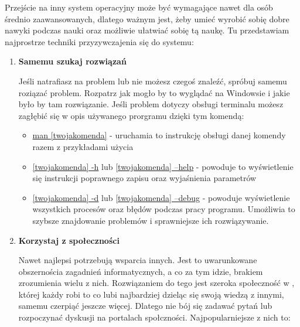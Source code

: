 \documentclass[10pt,a4paper]{report}
\begin{document}
Przejście na inny system operacyjny może być wymagające nawet dla osób średnio zaawansowanych, dlatego ważnym jest, żeby umieć wyrobić sobię dobre nawyki podczas nauki oraz możliwie ułatwiać sobię tą naukę. Tu przedstawiam najprostrze techniki przyzywczajenia się do systemu:
\begin{enumerate}
\item \textbf{Samemu szukaj rozwiązań} \par Jeśli natrafiasz na problem lub nie możesz czegoś znaleźć, spróbuj samemu roziązać problem. Rozpatrz jak mogło by to wyglądać na Windowsie i jakie było by tam rozwiązanie. Jeśli problem dotyczy obsługi terminalu możesz zagłębić się w opis używanego prorgramu dzięki tym komendą: \\
\begin{itemize}

\item \underline{man [twoja\textunderscore komenda]} - uruchamia to instrukcję obsługi danej komendy razem z przykładami użycia

\item  \underline{[twoja\textunderscore komenda] -h} lub \underline{[twoja\textunderscore komenda] --help} - powoduje to wyświetlenie się instrukcji poprawnego zapisu oraz wyjaśnienia parametrów

\item  \underline{[twoja\textunderscore komenda] -d} lub \underline{[twoja\textunderscore komenda] --debug} - powoduje wyświetlenie wszystkich procesów oraz błędów podczas pracy programu. Umożliwia to szybsze znajdowanie problemów i sprawniejsze ich rozwiązywanie.

\end{itemize}
\item \textbf{Korzystaj z społeczności} \par Nawet najlepsi potrzebują wsparcia innych. Jest to uwarunkowane obszernościa zagadnień informatycznych, a co za tym idzie, brakiem zrozumienia wielu z nich. Rozwiązaniem do tego jest szeroka społeczność w , której każdy robi to co lubi najbardziej dzieląc się swoją wiedzą z innymi, samemu czerpiąć jeszcze więcej. Dlatego nie bój się zadawać pytań lub rozpoczynać dyskusji na portalach społczności. Najpopularniejsze z nich to:


\end{enumerate}
\end{document}
